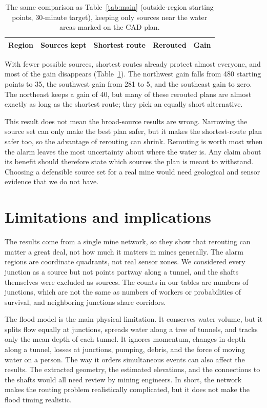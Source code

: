 \documentclass[11pt,a4paper]{article}
\begin{document}
\begin{table}[htbp]
\centering\small
\caption{The same comparison as Table~\ref{tab:main} (outside-region starting points, 30-minute target), keeping only sources near the water areas marked on the CAD plan.}\label{tab:near}
\begin{tabular}{@{}lrrrr@{}}\toprule
Region & Sources kept & Shortest route & Rerouted & Gain\\\midrule

\end{tabular}
\end{table}

With fewer possible sources, shortest routes already protect almost everyone, and most of the gain disappears (Table~\ref{tab:near}). The northwest gain falls from 480 starting points to 35, the southwest gain from 281 to 5, and the southeast gain to zero. The northeast keeps a gain of 40, but many of these rerouted plans are almost exactly as long as the shortest route; they pick an equally short alternative.

This result does not mean the broad-source results are wrong. Narrowing the source set can only make the best plan safer, but it makes the shortest-route plan safer too, so the advantage of rerouting can shrink. Rerouting is worth most when the alarm leaves the most uncertainty about where the water is. Any claim about its benefit should therefore state which sources the plan is meant to withstand. Choosing a defensible source set for a real mine would need geological and sensor evidence that we do not have.

\section{Limitations and implications}\label{sec:limits}
The results come from a single mine network, so they show that rerouting can matter a great deal, not how much it matters in mines generally. The alarm regions are coordinate quadrants, not real sensor zones. We considered every junction as a source but not points partway along a tunnel, and the shafts themselves were excluded as sources. The counts in our tables are numbers of junctions, which are not the same as numbers of workers or probabilities of survival, and neighboring junctions share corridors.

The flood model is the main physical limitation. It conserves water volume, but it splits flow equally at junctions, spreads water along a tree of tunnels, and tracks only the mean depth of each tunnel. It ignores momentum, changes in depth along a tunnel, losses at junctions, pumping, debris, and the force of moving water on a person. The way it orders simultaneous events can also affect the results. The extracted geometry, the estimated elevations, and the connections to the shafts would all need review by mining engineers. In short, the network makes the routing problem realistically complicated, but it does not make the flood timing realistic.
\end{document}
